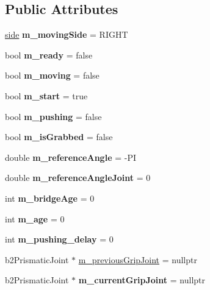 \subsection*{Public Attributes}
\begin{DoxyCompactItemize}
\item 
\mbox{\label{class_robot_af109e4e0b2d12e157567f62193511fd0}} 
\mbox{\hyperlink{_robot_8h_afc015eff6557e84151d2e53b94375445}{side}} {\bfseries m\+\_\+moving\+Side} = R\+I\+G\+HT
\item 
\mbox{\label{class_robot_a462bd9e9083124e8f338ff49cd86a0c8}} 
bool {\bfseries m\+\_\+ready} = false
\item 
\mbox{\label{class_robot_abfac70a3be8961e27c48b072e51feb99}} 
bool {\bfseries m\+\_\+moving} = false
\item 
\mbox{\label{class_robot_a5f54c940a885cdfb5336ce9922a23e95}} 
bool {\bfseries m\+\_\+start} = true
\item 
\mbox{\label{class_robot_ae4274f3936399195842a565c555d69e4}} 
bool {\bfseries m\+\_\+pushing} = false
\item 
\mbox{\label{class_robot_a1fcdb89ddb8babf254f3643d744529d3}} 
bool {\bfseries m\+\_\+is\+Grabbed} = false
\item 
\mbox{\label{class_robot_a249a544330f707aa161a0eb982a6ef15}} 
double {\bfseries m\+\_\+reference\+Angle} = -\/PI
\item 
\mbox{\label{class_robot_a6787e83aee94751e4a3cd7ccce805137}} 
double {\bfseries m\+\_\+reference\+Angle\+Joint} = 0
\item 
\mbox{\label{class_robot_afe6b7a8e2b86f4be0072a7d0d0ffa7be}} 
int {\bfseries m\+\_\+bridge\+Age} = 0
\item 
\mbox{\label{class_robot_a3524eefab579958fd78d816855bb55e5}} 
int {\bfseries m\+\_\+age} = 0
\item 
\mbox{\label{class_robot_a58c2e106a8d4e20219347bedc47a2e33}} 
int {\bfseries m\+\_\+pushing\+\_\+delay} = 0
\item 
b2\+Prismatic\+Joint $\ast$ \mbox{\hyperlink{class_robot_a35d0d222246bd7084fac5ae5cdf6d3ce}{m\+\_\+previous\+Grip\+Joint}} = nullptr
\item 
\mbox{\label{class_robot_a2ec77968c70b5ab286938e1189d52d23}} 
b2\+Prismatic\+Joint $\ast$ {\bfseries m\+\_\+current\+Grip\+Joint} = nullptr
\end{DoxyCompactItemize}


